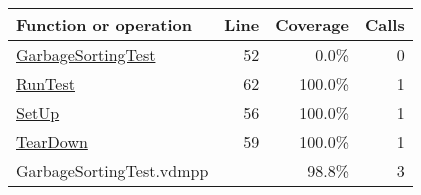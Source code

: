 \bigskip
\begin{longtable}{|l|r|r|r|}
\hline
Function or operation & Line & Coverage & Calls \\
\hline
\hline
\hyperref[GarbageSortingTest:52]{GarbageSortingTest} & 52&0.0\% & 0 \\
\hline
\hyperref[RunTest:62]{RunTest} & 62&100.0\% & 1 \\
\hline
\hyperref[SetUp:56]{SetUp} & 56&100.0\% & 1 \\
\hline
\hyperref[TearDown:59]{TearDown} & 59&100.0\% & 1 \\
\hline
\hline
GarbageSortingTest.vdmpp & & 98.8\% & 3 \\
\hline
\end{longtable}

